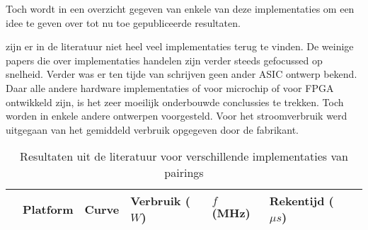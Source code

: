 Toch wordt in  een overzicht gegeven van enkele van deze implementaties om een idee te geven over tot nu toe gepubliceerde resultaten.

zijn er in de literatuur niet heel veel implementaties terug te vinden. De weinige papers die over implementaties handelen zijn verder steeds gefocussed op snelheid. Verder was er ten tijde van schrijven geen ander ASIC ontwerp bekend. Daar alle andere hardware implementaties of voor microchip of voor FPGA ontwikkeld zijn, is het zeer moeilijk onderbouwde conclussies te trekken. Toch worden in enkele andere ontwerpen voorgesteld. Voor het stroomverbruik werd uitgegaan van het gemiddeld verbruik opgegeven door de fabrikant.

\begin{table}[h]
	\caption{Resultaten uit de literatuur voor verschillende implementaties van pairings}
	\label{tabel-resultaten-andere}

	\centering
	\begin{tabular}{|l||l|l|l|l|l|l|}
		\hline
		&	Platform	& Curve	& Verbruik ($W$)	& $f$ (MHz)	& Rekentijd ($\mu s$)\\
		\hline
	\end{tabular}
\end{table}
